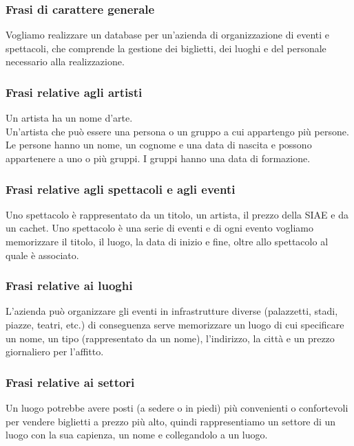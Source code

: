 \documentclass[a4paper,11pt]{article}
\begin{document}
\subsubsection*{Frasi di carattere generale}

Vogliamo realizzare un database per un'azienda di organizzazione di eventi e spettacoli, che comprende la gestione dei biglietti, dei luoghi e del personale necessario alla realizzazione.

\subsubsection*{Frasi relative agli artisti}

Un artista ha un nome d'arte.\\
Un'artista che può essere una persona o un gruppo a cui appartengo più persone.
Le persone hanno un nome, un cognome e una data di nascita e possono appartenere a uno o più gruppi.
I gruppi hanno una data di formazione.

\subsubsection*{Frasi relative agli spettacoli e agli eventi}

Uno spettacolo è rappresentato da un titolo, un artista, il prezzo della SIAE e da un cachet. Uno spettacolo è una serie di eventi e di ogni evento vogliamo memorizzare il titolo, il luogo, la data di inizio e fine, oltre allo spettacolo al quale è associato.

\subsubsection*{Frasi relative ai luoghi}

L'azienda può organizzare gli eventi in infrastrutture diverse (palazzetti, stadi, piazze, teatri, etc.) di conseguenza serve memorizzare un luogo di cui specificare un nome, un tipo (rappresentato da un nome), l'indirizzo, la città e un prezzo giornaliero per l'affitto.

\subsubsection*{Frasi relative ai settori}

Un luogo potrebbe avere posti (a sedere o in piedi) più convenienti o confortevoli per vendere biglietti a prezzo più alto, quindi rappresentiamo un settore di un luogo con la sua capienza, un nome e collegandolo a un luogo.
\end{document}
